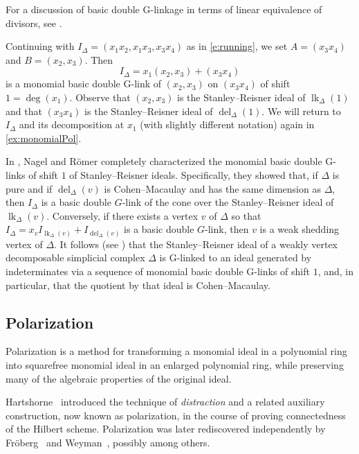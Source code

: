 \documentclass[12pt, reqno]{amsart}
\numberwithin{equation}{section}
\newtheorem{Main Conjecture}[theorem]{Main Conjecture}
\theoremstyle{definition}
\newenvironment{example}
  {\pushQED{\qed}\renewcommand{\qedsymbol}{$\diamondsuit$}\examplex}
  {\popQED\endexamplex}
\theoremstyle{plain}
\DeclareMathOperator{\lk}{lk}
\DeclareMathOperator{\del}{del}
\begin{document}
For a discussion of basic double G-linkage in terms of linear equivalence of divisors, see \cite[Section 4]{KMM+01}.

\begin{example}\label{e:running-2}
    Continuing with $I_\Delta =(x_1x_2,x_1x_3,x_3x_4)$ %
    as in \cref{e:running}, we set $A=(x_3x_4)$ and $B=(x_2,x_3)$. Then $$I_\Delta = x_1(x_2,x_3)+(x_3x_4)$$
     is a monomial basic double G-link of $(x_2,x_3)$ on $(x_3x_4)$ of shift $1 = \deg(x_1)$. Observe that $(x_2,x_3)$ is the Stanley--Reisner ideal of $\lk_\Delta(1)$ and that $(x_3x_4)$ is the Stanley--Reisner ideal of 
     $\del_\Delta(1)$.
        We will return to $I_\Delta$ and its decomposition at $x_1$ (with slightly different notation) again in \cref{ex:monomialPol}.
\end{example}



In \cite{NR08}, Nagel and R\"omer  completely characterized the monomial basic double G-links of shift $1$ of Stanley--Reisner ideals.  Specifically, they showed that, if $\Delta$ is pure and if $\del_{\Delta}(v)$ is Cohen--Macaulay and has the same dimension as $\Delta$, then $I_\Delta$ is a basic double $G$-link of the cone over the Stanley--Reisner ideal of $\lk_{\Delta}(v)$.  Conversely, if there exists a vertex $v$ of $\Delta$ so that $I_\Delta = x_v I_{\lk_{\Delta}(v)}+I_{\del_{\Delta}(v)}$ is a basic double $G$-link, then $v$ is a weak shedding vertex of $\Delta$. It follows (see \cite[Theorem 3.3]{NR08}) that the Stanley--Reisner ideal of a weakly vertex decomposable simplicial complex $\Delta$ is G-linked to an ideal generated by indeterminates via a sequence of monomial basic double G-links of shift $1$, and, in particular, that the quotient by that ideal is Cohen--Macaulay. 


\subsection{Polarization}

Polarization is a method for transforming a monomial ideal in a polynomial ring into squarefree monomial ideal in an enlarged polynomial ring, while preserving many of the algebraic properties of the original ideal.

Hartshorne~\cite{Har66} introduced the technique of \emph{distraction} and a related auxiliary construction, now known as polarization, in the course of proving connectedness of the Hilbert scheme. Polarization was later rediscovered independently by Fr\"oberg~\cite{Fr} and Weyman~\cite{W}, possibly among others. 
\end{document}
